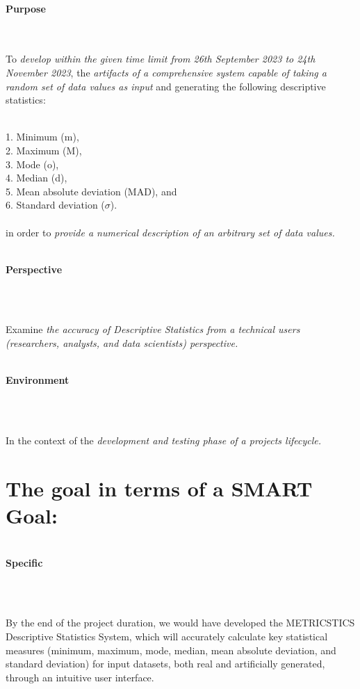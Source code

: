     \strut \\
    \textbf{\large Purpose}
    \strut \\ \\
    To \emph{develop within the given time limit from
    26th September 2023 to 24th
    November 2023}, the \emph{artifacts of a comprehensive system
    capable of taking a random set of data values as input} and
    generating the following descriptive statistics:\\
    \strut \\
    1. Minimum (m),\\
    2. Maximum (M),\\
    3. Mode (o),\\
    4. Median (d),\\
    5. Mean absolute deviation (MAD), and\\
    6. Standard deviation ($\sigma$).\\\\
    in order to \emph{provide a numerical description of an arbitrary
    set of data values.
    }
    
    \strut \\
    \textbf{\large Perspective}
    \strut \\
    \strut \\
    Examine \emph{the accuracy of Descriptive Statistics from a
    technical user\textquotesingle s (researchers, analysts, and data
    scientists) perspective.
    }
    
    \strut \\
    \textbf{\large Environment}
    \strut \\
    \strut \\
    In the context of the \emph{development and testing phase of a project\textquotesingle s lifecycle.
    }

    
    \pagebreak

    
    \section {The goal in terms of a SMART Goal:}
    
    \strut \\
    \textbf{\large Specific}
    \strut \\
    \strut \\
    By the end of the project duration, we would have developed the
    METRICSTICS Descriptive Statistics System, which will accurately
    calculate key statistical measures (minimum, maximum, mode, median,
    mean absolute deviation, and standard deviation) for input datasets,
    both real and artificially generated, through an intuitive user
    interface.
    

